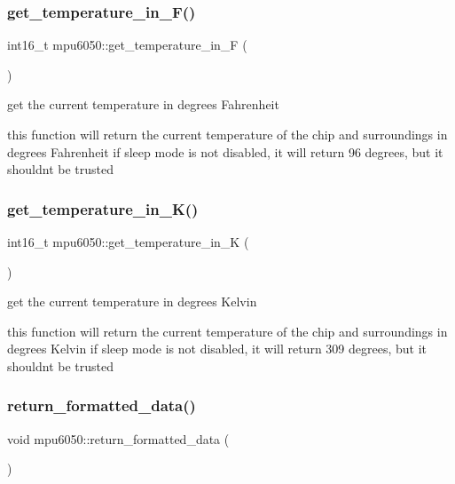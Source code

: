 \subsubsection{\texorpdfstring{get\+\_\+temperature\+\_\+in\+\_\+\+F()}{get\_temperature\_in\_F()}}
{\footnotesize\ttfamily int16\+\_\+t mpu6050\+::get\+\_\+temperature\+\_\+in\+\_\+F (\begin{DoxyParamCaption}{ }\end{DoxyParamCaption})\hspace{0.3cm}{\ttfamily [inline]}}



get the current temperature in degrees Fahrenheit 

this function will return the current temperature of the chip and surroundings in degrees Fahrenheit if sleep mode is not disabled, it will return 96 degrees, but it shouldn\textquotesingle{}t be trusted \mbox{\label{classmpu6050_a8cce3546551572c7518962c193183a17}} 
\subsubsection{\texorpdfstring{get\+\_\+temperature\+\_\+in\+\_\+\+K()}{get\_temperature\_in\_K()}}
{\footnotesize\ttfamily int16\+\_\+t mpu6050\+::get\+\_\+temperature\+\_\+in\+\_\+K (\begin{DoxyParamCaption}{ }\end{DoxyParamCaption})\hspace{0.3cm}{\ttfamily [inline]}}



get the current temperature in degrees Kelvin 

this function will return the current temperature of the chip and surroundings in degrees Kelvin if sleep mode is not disabled, it will return 309 degrees, but it shouldn\textquotesingle{}t be trusted \mbox{\label{classmpu6050_aef4c4ff834f62b2a57342fa6c761f701}} 
\subsubsection{\texorpdfstring{return\+\_\+formatted\+\_\+data()}{return\_formatted\_data()}}
{\footnotesize\ttfamily void mpu6050\+::return\+\_\+formatted\+\_\+data (\begin{DoxyParamCaption}{ }\end{DoxyParamCaption})\hspace{0.3cm}{\ttfamily [inline]}}



